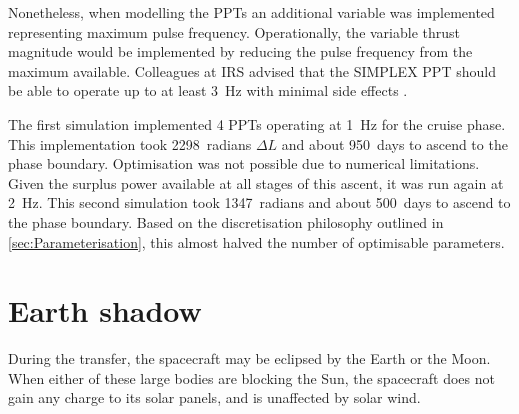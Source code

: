 
Nonetheless, when modelling the PPTs an additional variable was implemented representing maximum pulse frequency. Operationally, the variable thrust magnitude would be implemented by reducing the pulse frequency from the maximum available. Colleagues at IRS advised that the SIMPLEX PPT should be able to operate up to at least 3~Hz with minimal side effects \parencite{Cabrera2011}.

The first simulation implemented 4 PPTs operating at 1~Hz for the cruise phase. This implementation took 2298~radians $\Delta L$ and about 950~days to ascend to the phase boundary. Optimisation was not possible due to numerical limitations. Given the surplus power available at all stages of this ascent, it was run again at 2~Hz. This second simulation took 1347~radians and about 500~days to ascend to the phase boundary. Based on the discretisation philosophy outlined in \autoref{sec:Parameterisation}, this almost halved the number of optimisable parameters. 




\section{Earth shadow}

During the transfer, the spacecraft may be eclipsed by the Earth or the Moon. When either of these large bodies are blocking the Sun, the spacecraft does not gain any charge to its solar panels, and is unaffected by solar wind. 

